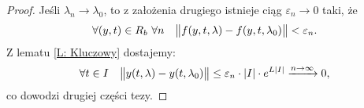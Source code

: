 \begin{proof}
  Jeśli $\lambda_n \to \lambda_0$, to z założenia drugiego istnieje ciąg $\varepsilon_n \to 0$ taki, że
  \[
    \forall (y,t) \in R_b \ \forall n \quad \norm[\big]{ f(y,t,\lambda) - f(y,t,\lambda_0) } < \varepsilon_n.
  \]
  Z lematu \ref{L: Kluczowy} dostajemy:
  \[
    \forall t \in I \quad \norm[\big]{ y(t,\lambda) - y(t,\lambda_0) } \leq
    \varepsilon_n \cdot \abs{I} \cdot e^{L \abs{I}} \xrightarrow{n\to\infty} 0,
  \]
  co dowodzi drugiej części tezy.
\end{proof}


































